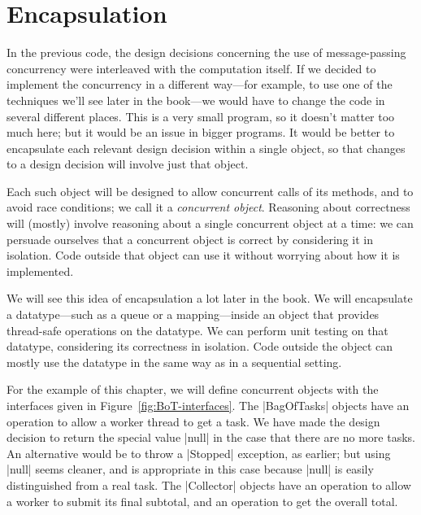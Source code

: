 \section{Encapsulation}
\label{sec:bag-of-tasks-encapsulation}

In the previous code, the design decisions concerning the use of
message-passing concurrency were interleaved with the computation itself.  If
we decided to implement the concurrency in a different way---for example, to
use one of the techniques we'll see later in the book---we would have to
change the code in several different places.  This is a very small program, so
it doesn't matter too much here; but it would be an issue in bigger programs.
%
It would be better to encapsulate each relevant design
decision within a single object, so that changes to a design decision will
involve just that object.

Each such object will be designed to allow concurrent calls of its methods,
and to avoid race conditions; we call it a \emph{concurrent
  object}.  Reasoning about correctness will (mostly)
involve reasoning about a single concurrent object at a time: we can persuade
ourselves that a concurrent object is correct by considering it in isolation.
Code outside that object can use it without worrying about how it is
implemented.

We will see this idea of encapsulation a lot later in the book.  We will
encapsulate a datatype---such as a queue or a mapping---inside an object that
provides thread-safe operations on the datatype.  We can perform unit testing
on that datatype, considering its correctness in isolation.  Code outside the
object can mostly use the datatype in the same way as in a sequential setting.


For the example of this chapter, we will define concurrent objects with the
interfaces given in Figure~\ref{fig:BoT-interfaces}.  The |BagOfTasks| objects
have an operation to allow a worker thread to get a task.  We have made the
design decision to return the special value |null| in the case that there are
no more tasks.  An alternative would be to throw a |Stopped| exception, as
earlier; but using |null| seems cleaner, and is appropriate in this case
because |null| is easily distinguished from a real task.  The |Collector|
objects have an operation to allow a worker to submit its final subtotal, and
an operation to get the overall total.



